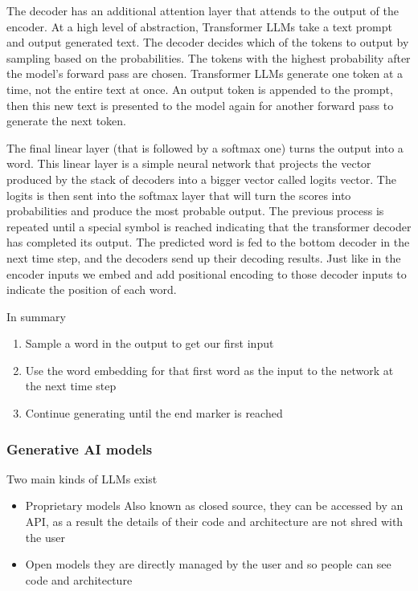 \vspace{10pt}

The decoder has an additional attention layer that attends to the output of the encoder. At a high level of abstraction, Transformer LLMs take a text prompt and output generated text. The decoder decides which of the tokens to output by sampling based on the probabilities. The tokens with the highest probability after the model's forward pass are chosen. Transformer LLMs generate one token at a time, not the entire text at once. An output token is appended to the prompt, then this new text is presented to the model again for another forward pass to generate the next token. 

\vspace{10pt}

The final linear layer (that is followed by a softmax one) turns the output into a word. This linear layer is a simple neural network that projects the vector produced by the stack of decoders into a bigger vector called logits vector. The logits is then sent into the softmax layer that will turn the scores into probabilities and produce the most probable output. The previous process is repeated until a special symbol is reached indicating that the transformer decoder has completed its output. The predicted word is fed to the bottom decoder in the next time step, and the decoders send up their decoding results. Just like in the encoder inputs we embed and add positional encoding to those decoder inputs to indicate the position of each word. 

\vspace{10pt}

In summary

\begin{enumerate}
    \item Sample a word in the output to get our first input
    \item Use the word embedding for that first word as the input to the network at the next time step
    \item Continue generating until the end marker is reached
\end{enumerate}

\subsubsection{Generative AI models}

Two main kinds of LLMs exist

\begin{itemize}
    \item Proprietary models \ra Also known as closed source, they can be accessed by an API, as a result the details of their code and architecture are not shred with the user
    \item Open models \ra they are directly managed by the user and so people can see code and architecture
\end{itemize}


